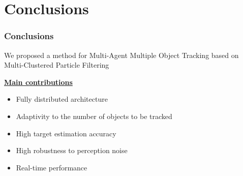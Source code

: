 \section{Conclusions}

\begin{frame}
	\frametitle{Conclusions}
	
	\Large
	
	\vspace{0.5cm}
	
	We proposed a method for Multi-Agent Multiple Object Tracking based on
	Multi-Clustered Particle Filtering
	
	\vspace{0.3cm}
	
	\underline{\textbf{Main contributions}}
	
	\begin{itemize}
		\item Fully distributed architecture
		\item Adaptivity to the number of objects to be tracked
		\item High target estimation accuracy
		\item High robustness to perception noise
		\item Real-time performance
	\end{itemize}
\end{frame}


